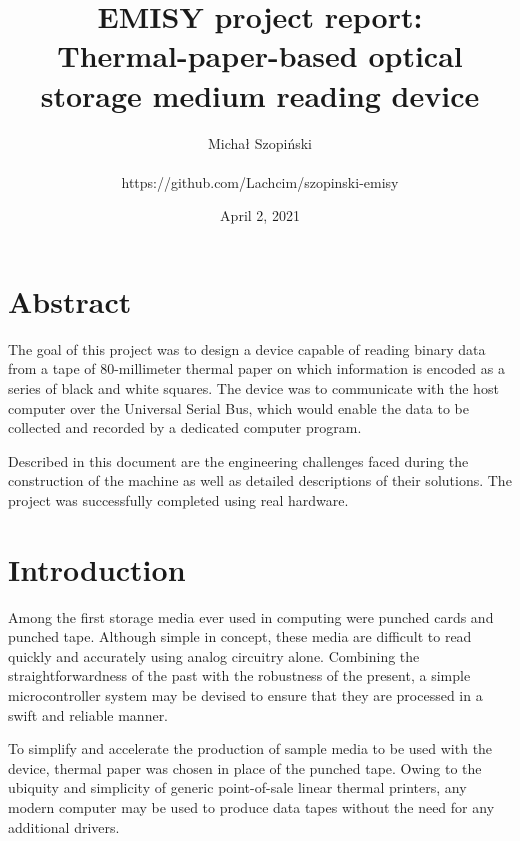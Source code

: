 \documentclass{article}
\begin{document}
	\title{EMISY project report:\\Thermal-paper-based optical storage medium
	reading device}
	\author{Michał Szopiński\\\\
	https://github.com/Lachcim/szopinski-emisy}
	\date{April 2, 2021}
	\maketitle
	
	\setcounter{section}{-1}
	\section{Abstract}
	
	The goal of this project was to design a device capable of reading binary
	data from a tape of 80-millimeter thermal paper on which information is
	encoded as a series of black and white squares. The device was to
	communicate with the host computer over the Universal Serial Bus, which
	would enable the data to be collected and recorded by a dedicated computer
	program.
	
	Described in this document are the engineering challenges faced during the
	construction of the machine as well as detailed descriptions of their
	solutions. The project was successfully completed using real hardware.
	
	\newpage
	\renewcommand{\baselinestretch}{0}\normalsize
	\tableofcontents
	\renewcommand{\baselinestretch}{1}\normalsize
	
	\newpage
	\section{Introduction}
	
	Among the first storage media ever used in computing were punched cards and
	punched tape. Although simple in concept, these media are difficult to read
	quickly and accurately using analog circuitry alone. Combining the
	straightforwardness of the past with the robustness of the present, a
	simple microcontroller system may be devised to ensure that they are
	processed in a swift and reliable manner.
	
	To simplify and accelerate the production of sample media to be used with
	the device, thermal paper was chosen in place of the punched tape. Owing to
	the ubiquity and simplicity of generic point-of-sale linear thermal
	printers, any modern computer may be used to produce data tapes without the
	need for any additional drivers.
	
\end{document}
